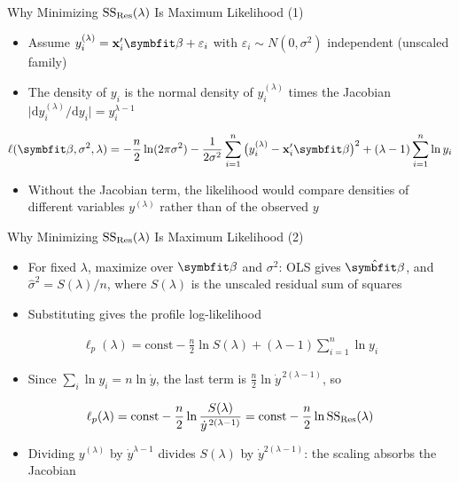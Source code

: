 \begin{frame}{Why Minimizing $\mathrm{SS}_{\mathrm{Res}}(\lambda)$ Is Maximum Likelihood (1)}
\begin{itemize}
    \item Assume $y_i^{(\lambda)} = \bx_i'\bbeta + \varepsilon_i$ with $\varepsilon_i \sim N(0, \sigma^2)$ independent (unscaled family)
    \item The density of $y_i$ is the normal density of $y_i^{(\lambda)}$ times the Jacobian $\big|\mathrm{d} y_i^{(\lambda)}/\mathrm{d} y_i\big| = y_i^{\lambda - 1}$
\end{itemize}
\begin{align*}
    \ell(\bbeta, \sigma^2, \lambda) = -\frac{n}{2}\ln(2\pi\sigma^2) - \frac{1}{2\sigma^2}\sum_{i=1}^{n}\big(y_i^{(\lambda)} - \bx_i'\bbeta\big)^2 + (\lambda - 1)\sum_{i=1}^{n} \ln y_i
\end{align*}
\begin{itemize}
    \item Without the Jacobian term, the likelihood would compare densities of different variables $y^{(\lambda)}$ rather than of the observed $y$
\end{itemize}
\end{frame}


\begin{frame}{Why Minimizing $\mathrm{SS}_{\mathrm{Res}}(\lambda)$ Is Maximum Likelihood (2)}
\begin{itemize}
    \item For fixed $\lambda$, maximize over $\bbeta$ and $\sigma^2$: OLS gives $\hat{\bbeta}$, and $\hat{\sigma}^2 = S(\lambda)/n$, where $S(\lambda)$ is the unscaled residual sum of squares
    \item Substituting gives the profile log-likelihood
\end{itemize}
\begin{align*}
    \ell_p(\lambda) = \text{const} - \frac{n}{2}\ln S(\lambda) + (\lambda - 1)\sum_{i=1}^{n} \ln y_i
\end{align*}
\begin{itemize}
    \item Since $\sum_i \ln y_i = n \ln \dot{y}$, the last term is $\tfrac{n}{2}\ln \dot{y}^{\,2(\lambda - 1)}$, so
\end{itemize}
\begin{align*}
    \ell_p(\lambda) = \text{const} - \frac{n}{2}\ln \frac{S(\lambda)}{\dot{y}^{\,2(\lambda - 1)}} = \text{const} - \frac{n}{2}\ln \mathrm{SS}_{\mathrm{Res}}(\lambda)
\end{align*}
\begin{itemize}
    \item Dividing $y^{(\lambda)}$ by $\dot{y}^{\lambda - 1}$ divides $S(\lambda)$ by $\dot{y}^{2(\lambda-1)}$: the scaling absorbs the Jacobian
\end{itemize}
\end{frame}


